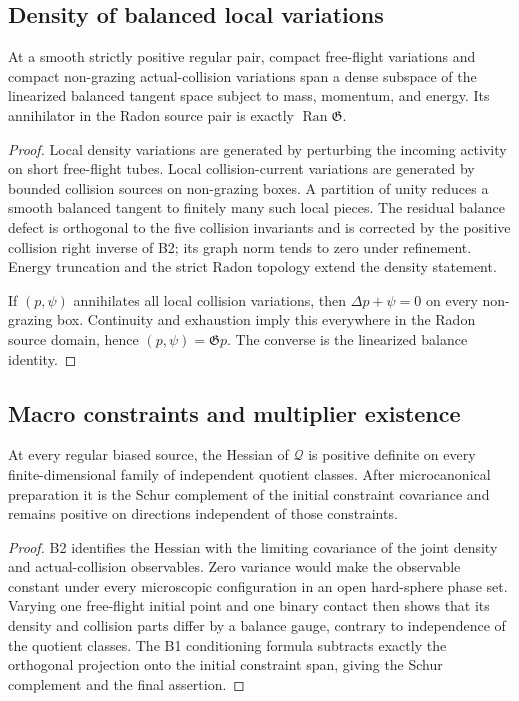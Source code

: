\subsection{Density of balanced local variations}

\begin{lemma}
\label{lem:r3-b3-local-density}
At a smooth strictly positive regular pair, compact free-flight variations and
compact non-grazing actual-collision variations span a dense subspace of the
linearized balanced tangent space subject to mass, momentum, and energy.  Its
annihilator in the Radon source pair is exactly
\(\operatorname{Ran}\mathfrak G\).
\end{lemma}

\begin{proof}
Local density variations are generated by perturbing the incoming activity on
short free-flight tubes.  Local collision-current variations are generated by
bounded collision sources on non-grazing boxes.  A partition of unity reduces
a smooth balanced tangent to finitely many such local pieces.  The residual
balance defect is orthogonal to the five collision invariants and is corrected
by the positive collision right inverse of B2; its graph norm tends to zero
under refinement.  Energy truncation and the strict Radon topology extend the
density statement.

If \((p,\psi)\) annihilates all local collision variations, then
\(\Delta p+\psi=0\) on every non-grazing box.  Continuity and exhaustion imply
this everywhere in the Radon source domain, hence
\((p,\psi)=\mathfrak Gp\).  The converse is the linearized balance identity.
\end{proof}

\subsection{Macro constraints and multiplier existence}

\begin{lemma}
\label{lem:r3-b3-positive}
At every regular biased source, the Hessian of \(\mathcal Q\) is positive
definite on every finite-dimensional family of independent quotient classes.
After microcanonical preparation it is the Schur complement of the initial
constraint covariance and remains positive on directions independent of those
constraints.
\end{lemma}

\begin{proof}
B2 identifies the Hessian with the limiting covariance of the joint density
and actual-collision observables.  Zero variance would make the observable
constant under every microscopic configuration in an open hard-sphere phase
set.  Varying one free-flight initial point and one binary contact then shows
that its density and collision parts differ by a balance gauge, contrary to
independence of the quotient classes.  The B1 conditioning formula subtracts
exactly the orthogonal projection onto the initial constraint span, giving the
Schur complement and the final assertion.
\end{proof}

